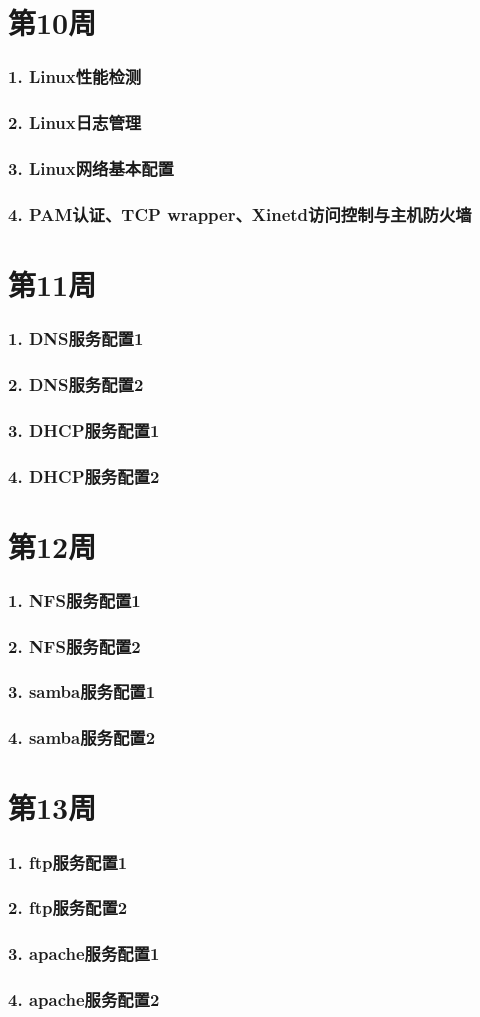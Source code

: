 \documentclass[bigger]{beamer}
\begin{document}
\section{第10周}
\label{sec-10}
\begin{frame}
\frametitle{1. Linux性能检测}
\label{sec-10-1}
\end{frame}
\begin{frame}
\frametitle{2. Linux日志管理}
\label{sec-10-2}
\end{frame}
\begin{frame}
\frametitle{3. Linux网络基本配置}
\label{sec-10-3}
\end{frame}
\begin{frame}
\frametitle{4. PAM认证、TCP wrapper、Xinetd访问控制与主机防火墙}
\label{sec-10-4}
\end{frame}
\section{第11周}
\label{sec-11}
\begin{frame}
\frametitle{1. DNS服务配置1}
\label{sec-11-1}
\end{frame}
\begin{frame}
\frametitle{2. DNS服务配置2}
\label{sec-11-2}
\end{frame}
\begin{frame}
\frametitle{3. DHCP服务配置1}
\label{sec-11-3}
\end{frame}
\begin{frame}
\frametitle{4. DHCP服务配置2}
\label{sec-11-4}
\end{frame}
\section{第12周}
\label{sec-12}
\begin{frame}
\frametitle{1. NFS服务配置1}
\label{sec-12-1}
\end{frame}
\begin{frame}
\frametitle{2. NFS服务配置2}
\label{sec-12-2}
\end{frame}
\begin{frame}
\frametitle{3. samba服务配置1}
\label{sec-12-3}
\end{frame}
\begin{frame}
\frametitle{4. samba服务配置2}
\label{sec-12-4}
\end{frame}
\section{第13周}
\label{sec-13}
\begin{frame}
\frametitle{1. ftp服务配置1}
\label{sec-13-1}
\end{frame}
\begin{frame}
\frametitle{2. ftp服务配置2}
\label{sec-13-2}
\end{frame}
\begin{frame}
\frametitle{3. apache服务配置1}
\label{sec-13-3}
\end{frame}
\begin{frame}
\frametitle{4. apache服务配置2}
\label{sec-13-4}
\end{frame}
\end{document}
